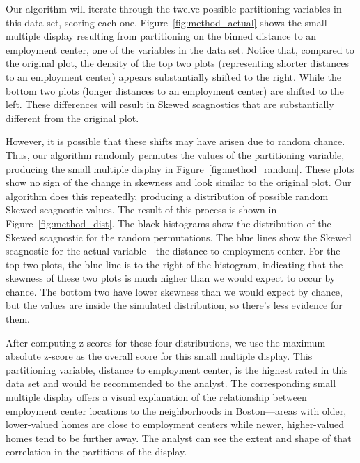 Our algorithm will iterate through the twelve possible partitioning variables in this data set, scoring each one. Figure~\ref{fig:method_actual} shows the small multiple display resulting from partitioning on the binned distance to an employment center, one of the variables in the data set. Notice that, compared to the original plot, the density of the top two plots (representing shorter distances to an employment center) appears substantially shifted to the right. While the bottom two plots (longer distances to an employment center) are shifted to the left. These differences will result in Skewed scagnostics that are substantially different from the original plot. 

However, it is possible that these shifts may have arisen due to random chance. Thus, our algorithm randomly permutes the values of the partitioning variable, producing the small multiple display in Figure~\ref{fig:method_random}. These plots show no sign of the change in skewness and look similar to the original plot. 
Our algorithm does this repeatedly, producing a distribution of possible random Skewed scagnostic values. The result of this process is shown in Figure~\ref{fig:method_dist}. The black histograms show the distribution of the Skewed scagnostic for the random permutations. The blue lines show the Skewed scagnostic for the actual variable---the distance to employment center. For the top two plots, the blue line is to the right of the histogram, indicating that the skewness of these two plots is much higher than we would expect to occur by chance. The bottom two have lower skewness than we would expect by chance, but the values are inside the simulated distribution, so there's less evidence for them.

After computing z-scores for these four distributions, we use the maximum absolute z-score as the overall score for this small multiple display. This partitioning variable, distance to employment center, is the highest rated in this data set and would be recommended to the analyst. The corresponding small multiple display offers a visual explanation of the relationship between employment center locations to the neighborhoods in Boston---areas with older, lower-valued homes are close to employment centers while newer, higher-valued homes tend to be further away. The analyst can see the extent and shape of that correlation in the partitions of the display.
